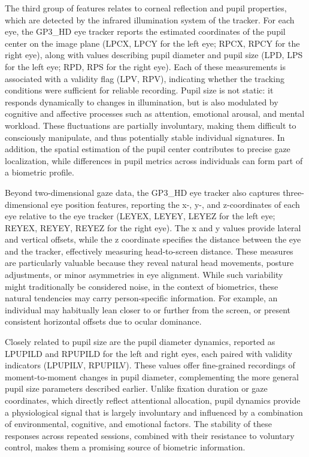 \documentclass[12pt]{report}
\begin{document}
The third group of features relates to corneal reflection and pupil properties, which are detected by the infrared illumination system of the tracker. 
For each eye, the GP3\_HD eye tracker reports the estimated coordinates of the pupil center on the image plane (LPCX, LPCY for the left eye; RPCX, RPCY for the right eye), along with values describing pupil diameter and pupil size (LPD, LPS for the left eye; RPD, RPS for the right eye). 
Each of these measurements is associated with a validity flag (LPV, RPV), indicating whether the tracking conditions were sufficient for reliable recording. 
Pupil size is not static: it responds dynamically to changes in illumination, but is also modulated by cognitive and affective processes such as attention, emotional arousal, and mental workload. 
These fluctuations are partially involuntary, making them difficult to consciously manipulate, and thus potentially stable individual signatures. 
In addition, the spatial estimation of the pupil center contributes to precise gaze localization, while differences in pupil metrics across individuals can form part of a biometric profile.

Beyond two-dimensional gaze data, the GP3\_HD eye tracker also captures three-dimensional eye position features, reporting the x-, y-, and z-coordinates of each eye relative to the eye tracker (LEYEX, LEYEY, LEYEZ for the left eye; REYEX, REYEY, REYEZ for the right eye). 
The x and y values provide lateral and vertical offsets, while the z coordinate specifies the distance between the eye and the tracker, effectively measuring head-to-screen distance. 
These measures are particularly valuable because they reveal natural head movements, posture adjustments, or minor asymmetries in eye alignment. 
While such variability might traditionally be considered noise, in the context of biometrics, these natural tendencies may carry person-specific information. 
For example, an individual may habitually lean closer to or further from the screen, or present consistent horizontal offsets due to ocular dominance.

Closely related to pupil size are the pupil diameter dynamics, reported as LPUPILD and RPUPILD for the left and right eyes, each paired with validity indicators (LPUPILV, RPUPILV). 
These values offer fine-grained recordings of moment-to-moment changes in pupil diameter, complementing the more general pupil size parameters described earlier. 
Unlike fixation duration or gaze coordinates, which directly reflect attentional allocation, pupil dynamics provide a physiological signal that is largely involuntary and influenced by a combination of environmental, cognitive, and emotional factors.
The stability of these responses across repeated sessions, combined with their resistance to voluntary control, makes them a promising source of biometric information.
\end{document}
